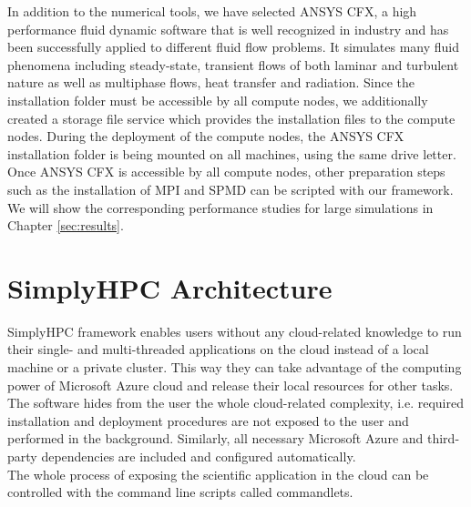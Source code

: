 \documentclass[3p,times]{elsarticle}
\begin{document}
In addition to the numerical tools, we have selected ANSYS CFX, a high performance fluid dynamic software that is well recognized in industry and has been successfully applied to different fluid flow problems. It simulates many fluid phenomena including steady-state, transient flows of both laminar and turbulent nature as well as multiphase flows, heat transfer and radiation. Since the installation folder must be accessible by all compute nodes, we additionally created a storage file service which provides the installation files to the compute nodes. During the deployment of the compute nodes, the ANSYS CFX installation folder is being mounted on all machines, using the same drive letter. Once ANSYS CFX is accessible by all compute nodes, other preparation steps such as the installation of MPI and SPMD can be scripted with our framework. We will show the corresponding performance studies for large simulations in Chapter \ref{sec:results}.

\section{SimplyHPC Architecture}
\label{sec:architecture}


SimplyHPC framework enables users without any cloud-related knowledge to run their single- and multi-threaded applications on the cloud instead of a local machine or a private cluster. This way they can take advantage of the computing power of Microsoft Azure cloud and release their local resources for other tasks. The software hides from the user the whole cloud-related complexity, i.e. required installation and deployment procedures are not exposed to the user and performed in the background. Similarly, all necessary Microsoft Azure and third-party dependencies are included and configured automatically. \\
The whole process of exposing the scientific application in the cloud can be controlled with the command line scripts called commandlets. 
\end{document}
